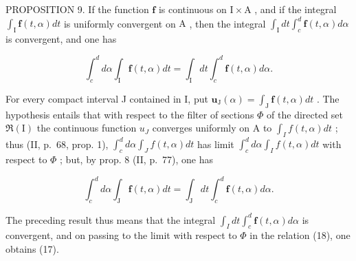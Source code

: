 PROPOSITION 9. If the function \(\mathbf{f}\) is continuous on \(\mathrm{I} \times \mathrm{A}\) , and if the integral \(\int_{\mathrm{I}} \mathbf{f}(t, \alpha) dt\) is uniformly convergent on \(\mathrm{A}\) , then the integral \(\int_{\mathrm{I}} dt \int_{c}^{d} \mathbf{f}(t, \alpha) d\alpha\) is convergent, and one has

\[
\int_ {c} ^ {d} d \alpha \int_ {\mathrm{I}} \mathbf {f} (t, \alpha) d t = \int_ {\mathrm{I}} d t \int_ {c} ^ {d} \mathbf {f} (t, \alpha) d \alpha .\tag{17}
\]

For every compact interval J contained in I, put \(\mathbf{u}_{\mathrm{J}}(\alpha) = \int_{\mathrm{J}} \mathbf{f}(t, \alpha) dt\) . The hypothesis entails that with respect to the filter of sections \(\Phi\) of the directed set \(\Re(\mathrm{I})\) the continuous function \(u_{J}\) converges uniformly on A to \(\int_{I} f(t, \alpha) dt\) ; thus (II, p.~68, prop. 1), \(\int_{c}^{d} d\alpha \int_{J} f(t, \alpha) dt\) has limit \(\int_{c}^{d} d\alpha \int_{I} f(t, \alpha) dt\) with respect to \(\Phi\) ; but, by prop. 8 (II, p.~77), one has

\[
\int_ {c} ^ {d} d \alpha \int_ {\mathrm{J}} \mathbf {f} (t, \alpha) d t = \int_ {\mathrm{J}} d t \int_ {c} ^ {d} \mathbf {f} (t, \alpha) d \alpha .\tag{18}
\]

The preceding result thus means that the integral \(\int_{I} dt \int_{c}^{d} \mathbf{f}(t, \alpha) d\alpha\) is convergent, and on passing to the limit with respect to \(\Phi\) in the relation (18), one obtains (17).

\setcounter{exercisegroup}{0}
